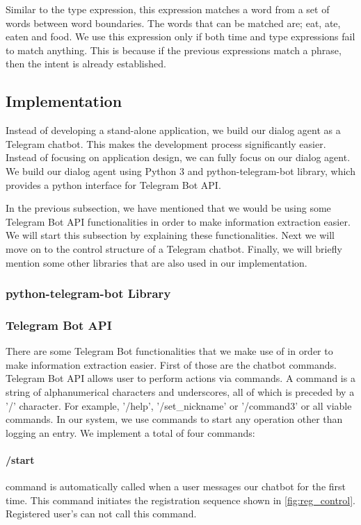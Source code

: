 Similar to the type expression, this expression matches a word from a set of words between word boundaries.
The words that can be matched are; eat, ate, eaten and food.
We use this expression only if both time and type expressions fail to match anything.
This is because if the previous expressions match a phrase, then the intent is already established.

\subsection{Implementation}
Instead of developing a stand-alone application, we build our dialog agent as a Telegram chatbot.
This makes the development process significantly easier.
Instead of focusing on application design, we can fully focus on our dialog agent.
We build our dialog agent using Python 3 and python-telegram-bot library, which provides a python interface for Telegram Bot API.

In the previous subsection, we have mentioned that we would be using some Telegram Bot API functionalities in order to make information extraction easier. 
We will start this subsection by explaining these functionalities.
Next we will move on to the control structure of a Telegram chatbot.
Finally, we will briefly mention some other libraries that are also used in our implementation.
\subsubsection{python-telegram-bot Library}
\subsubsection{Telegram Bot API}
There are some Telegram Bot functionalities that we make use of in order to make information extraction easier.
First of those are the chatbot commands.
Telegram Bot API allows user to perform actions via commands.
A command is a string of alphanumerical characters and underscores, all of which is preceded by a '/' character.
For example, '/help', '/set\_nickname' or '/command3' or all viable commands.
In our system, we use commands to start any operation other than logging an entry.
We implement a total of four commands:

\paragraph{/start} command is automatically called when a user messages our chatbot for the first time. This command initiates the registration sequence shown in \autoref{fig:reg_control}. Registered user's can not call this command.

